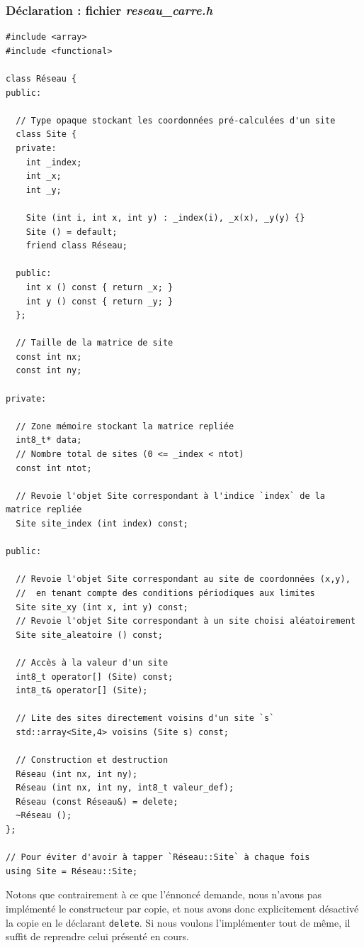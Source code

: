 \documentclass{book}
\newcommand{\inline}[1]{\texttt{#1}}
\def\filename{\emph}
\begin{document}
\begin{correction}
\subsubsection*{Déclaration : fichier \filename{reseau\_carre.h}}

\begin{verbatim}
#include <array>
#include <functional>

class Réseau {
public:

  // Type opaque stockant les coordonnées pré-calculées d'un site
  class Site {
  private:
    int _index;
    int _x;
    int _y;

    Site (int i, int x, int y) : _index(i), _x(x), _y(y) {}
    Site () = default;
    friend class Réseau;

  public:
    int x () const { return _x; }
    int y () const { return _y; }
  };

  // Taille de la matrice de site
  const int nx;
  const int ny;

private:

  // Zone mémoire stockant la matrice repliée
  int8_t* data;
  // Nombre total de sites (0 <= _index < ntot)
  const int ntot;

  // Revoie l'objet Site correspondant à l'indice `index` de la matrice repliée
  Site site_index (int index) const;

public:

  // Revoie l'objet Site correspondant au site de coordonnées (x,y),
  //  en tenant compte des conditions périodiques aux limites
  Site site_xy (int x, int y) const;
  // Revoie l'objet Site correspondant à un site choisi aléatoirement
  Site site_aleatoire () const;

  // Accès à la valeur d'un site
  int8_t operator[] (Site) const;
  int8_t& operator[] (Site);

  // Lite des sites directement voisins d'un site `s`
  std::array<Site,4> voisins (Site s) const;

  // Construction et destruction
  Réseau (int nx, int ny);
  Réseau (int nx, int ny, int8_t valeur_def);
  Réseau (const Réseau&) = delete;
  ~Réseau ();
};

// Pour éviter d'avoir à tapper `Réseau::Site` à chaque fois
using Site = Réseau::Site;
\end{verbatim}

Notons que contrairement à ce que l'énnoncé demande, nous n'avons pas implémenté le constructeur par copie, et nous avons donc explicitement désactivé la copie en le déclarant \inline{delete}. Si nous voulons l'implémenter tout de même, il suffit de reprendre celui présenté en cours.


\end{correction}
\end{document}
